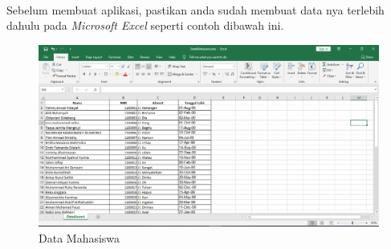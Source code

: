 \documentclass{article}
\begin{document}
\paragraph{}
Sebelum membuat aplikasi, pastikan anda sudah membuat data nya terlebih dahulu pada \textit{Microsoft Excel} seperti contoh dibawah ini.
\begin{figure}[!htbp]
    \centering
    \includegraphics[scale=0.3]{figure/Data.PNG}
    \caption{Data Mahasiswa}
\end{figure}
\end{document}
